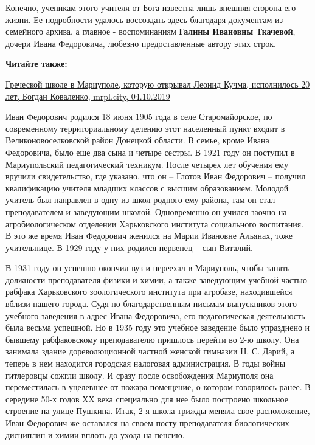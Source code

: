 
Конечно, ученикам этого учителя от Бога известна лишь внешняя сторона его
жизни. Ее подробности удалось воссоздать здесь благодаря документам из
семейного архива, а главное - воспоминаниям \textbf{Галины Ивановны Ткачевой}, дочери
Ивана Федоровича, любезно предоставленные автору этих строк.

\textbf{Читайте также:} 

\href{https://mrpl.city/news/view/grecheskoj-shkole-v-mariupole-kotoruyu-otkryval-leonid-kuchma-ispolnilos-20-let-foto}{%
Греческой школе в Мариуполе, которую открывал Леонид Кучма, исполнилось 20 лет, %
Богдан Коваленко, mrpl.city, 04.10.2019}

Иван Федорович родился 18 июня 1905 года в селе Старомайорское, по современному
территориальному делению этот населенный пункт входит в Великоновоселковской
район Донецкой области. В семье, кроме Ивана Федоровича, было еще два сына и
четыре сестры. В 1921 году он поступил в Мариупольский педагогический техникум.
После четырех лет обучения ему вручили свидетельство, где указано, что он –
Глотов Иван Федорович – получил квалификацию учителя младших классов с высшим
образованием. Молодой учитель был направлен в одну из школ родного ему района,
там он стал преподавателем и заведующим школой. Одновременно он учился заочно
на агробиологическом отделении Харьковского института социального воспитания. В
это же время Иван Федорович женился на Марии Ивановне Альянах, тоже
учительнице. В 1929 году у них родился первенец – сын Виталий.

В 1931 году он успешно окончил вуз и переехал в Мариуполь, чтобы занять
должности преподавателя физики и химии, а также заведующим учебной частью
рабфака Харьковского зоологического института при агробазе, находившейся вблизи
нашего города. Судя по благодарственным письмам выпускников этого учебного
заведения в адрес Ивана Федоровича, его педагогическая деятельность была весьма
успешной. Но в 1935 году это учебное заведение было упразднено и бывшему
рабфаковскому преподавателю пришлось перейти во 2-ю школу. Она занимала здание
дореволюционной частной женской гимназии Н. С. Дарий, а теперь в нем находится
городская налоговая администрация. В годы войны гитлеровцы сожгли школу. И
сразу после освобождения Мариуполя она переместилась в уцелевшее от пожара
помещение, о котором говорилось ранее. В середине 50-х годов ХХ века специально
для нее было построено школьное строение на улице Пушкина. Итак, 2-я школа
трижды меняла свое расположение, Иван Федорович же оставался на своем посту
преподавателя биологических дисциплин и химии вплоть до ухода на пенсию.

